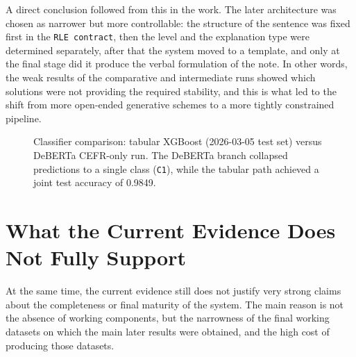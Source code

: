 \documentclass[12pt,a4paper,oneside]{report}
\begin{document}
A direct conclusion followed from this in the work. The later architecture was chosen as narrower but more controllable: the structure of the sentence was fixed first in the \texttt{RLE contract}, then the level and the explanation type were determined separately, after that the system moved to a template, and only at the final stage did it produce the verbal formulation of the note. In other words, the weak results of the comparative and intermediate runs showed which solutions were not providing the required stability, and this is what led to the shift from more open-ended generative schemes to a more tightly constrained pipeline.

\begin{figure}[H]
\centering
{}
\caption{Classifier comparison: tabular XGBoost (2026-03-05 test set) versus DeBERTa CEFR-only run. The DeBERTa branch collapsed predictions to a single class (\texttt{C1}), while the tabular path achieved a joint test accuracy of 0.9849.}
\label{fig:classifiercmp}
\end{figure}

\section{What the Current Evidence Does Not Fully Support}
At the same time, the current evidence still does not justify very strong claims about the completeness or final maturity of the system. The main reason is not the absence of working components, but the narrowness of the final working datasets on which the main later results were obtained, and the high cost of producing those datasets.
\end{document}
